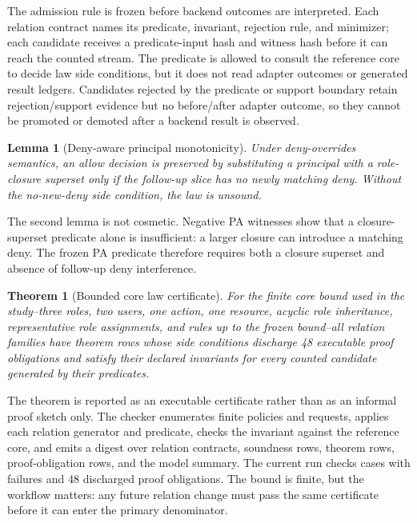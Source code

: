 \documentclass[10pt,conference]{IEEEtran}
\newtheorem{lemma}{Lemma}
\newtheorem{theorem}{Theorem}
\begin{document}
The admission rule is frozen before backend outcomes are interpreted.  Each relation contract names its predicate, invariant, rejection rule, and minimizer; each candidate receives a predicate-input hash and witness hash before it can reach the counted stream.  The predicate is allowed to consult the reference core to decide law side conditions, but it does not read adapter outcomes or generated result ledgers.  Candidates rejected by the predicate or support boundary retain rejection/support evidence but no before/after adapter outcome, so they cannot be promoted or demoted after a backend result is observed.

\begin{lemma}[Deny-aware principal monotonicity]
Under deny-overrides semantics, an allow decision is preserved by substituting a principal with a role-closure superset only if the follow-up slice has no newly matching deny.  Without the no-new-deny side condition, the law is unsound.
\end{lemma}

\noindent The second lemma is not cosmetic.  Negative PA witnesses show that a closure-superset predicate alone is insufficient: a larger closure can introduce a matching deny.  The frozen PA predicate therefore requires both a closure superset and absence of follow-up deny interference.

\begin{theorem}[Bounded core law certificate]
For the finite core bound used in the study--three roles, two users, one action, one resource, acyclic role inheritance, representative role assignments, and rules up to the frozen bound--all \LGRelations{} relation families have theorem rows whose side conditions discharge 48 executable proof obligations and satisfy their declared invariants for every counted candidate generated by their predicates.
\end{theorem}

\noindent The theorem is reported as an executable certificate rather than as an informal proof sketch only.  The checker enumerates finite policies and requests, applies each relation generator and predicate, checks the invariant against the reference core, and emits a digest over relation contracts, soundness rows, theorem rows, proof-obligation rows, and the model summary.  The current run checks \LGModelCheckCases{} cases with \LGModelCheckFailures{} failures and 48 discharged proof obligations.  The bound is finite, but the workflow matters: any future relation change must pass the same certificate before it can enter the primary denominator.
\end{document}
